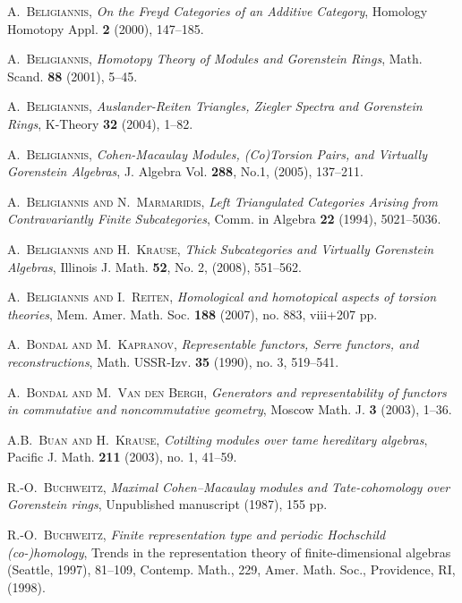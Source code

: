 \documentclass[oneside, a4paper,reqno]{amsart}
\numberwithin{equation}{section}
\theoremstyle{definition}
\begin{document}
\begin{thebibliography}{99}
\textsc{A.~Beligiannis}, \textit{On the Freyd Categories of an Additive Category},
Homology Homotopy Appl. {\bf 2} (2000), 147--185.

\textsc{A.~Beligiannis}, \textit{Homotopy Theory of Modules and Gorenstein Rings},
Math. Scand. {\bf 88} (2001), 5--45.

\textsc{A.~Beligiannis}, \textit{Auslander-Reiten Triangles, Ziegler Spectra and
Gorenstein Rings}, K-Theory {\bf 32} (2004), 1--82.

\textsc{A.~Beligiannis}, \textit{Cohen-Macaulay Modules, (Co)Torsion Pairs, and
Virtually Gorenstein Algebras}, J. Algebra Vol. {\bf 288}, No.1,
(2005), 137--211.

\textsc{A.~Beligiannis and N.~Marmaridis}, \textit{Left Triangulated
Categories Arising from Contravariantly Finite Subcategories}, Comm.
in Algebra {\bf 22} (1994), 5021--5036.

\textsc{A.~Beligiannis and H.~Krause}, \textit{Thick Subcategories and
Virtually Gorenstein Algebras}, Illinois J. Math. {\bf 52}, No. 2, (2008), 551--562.

\textsc{A.~Beligiannis and I.~Reiten}, \textit{Homological and homotopical
aspects of torsion theories}, Mem. Amer. Math. Soc. {\bf 188}
(2007), no. 883, viii+207 pp.

\textsc{A.~Bondal and M.~Kapranov}, \textit{Representable functors,
Serre functors, and reconstructions}, Math. USSR-Izv.  {\bf 35}
(1990), no. 3, 519--541.

\textsc{A.~Bondal and M.~Van den Bergh},  \textit{Generators and
representability of functors in commutative and noncommutative
geometry},  Moscow Math. J. {\bf 3} (2003), 1--36.

\textsc{A.B.~Buan and H.~Krause}, \textit{Cotilting modules over tame
hereditary algebras},  Pacific J. Math. {\bf 211} (2003), no. 1,
41--59.

\textsc{R.-O.~Buchweitz}, \textit{Maximal Cohen--Macaulay modules and
Tate-cohomology over Gorenstein rings}, Unpublished manuscript
(1987), 155 pp.

\textsc{R.-O.~Buchweitz}, \textit{Finite representation type and periodic Hochschild
(co-)homology}, Trends in the representation theory of
finite-dimensional algebras (Seattle, 1997),  81--109, Contemp.
Math., 229, Amer. Math. Soc., Providence, RI, (1998).


\end{thebibliography}
\end{document}
